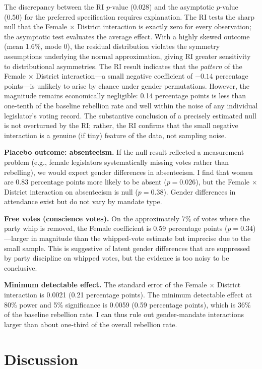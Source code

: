 \documentclass[12pt]{article}
\begin{document}
The discrepancy between the RI $p$-value (0.028) and the asymptotic $p$-value (0.50) for the preferred specification requires explanation. The RI tests the sharp null that the Female $\times$ District interaction is exactly zero for every observation; the asymptotic test evaluates the average effect. With a highly skewed outcome (mean 1.6\%, mode 0), the residual distribution violates the symmetry assumptions underlying the normal approximation, giving RI greater sensitivity to distributional asymmetries. The RI result indicates that the \textit{pattern} of the Female $\times$ District interaction---a small negative coefficient of $-0.14$ percentage points---is unlikely to arise by chance under gender permutations. However, the magnitude remains economically negligible: 0.14 percentage points is less than one-tenth of the baseline rebellion rate and well within the noise of any individual legislator's voting record. The substantive conclusion of a precisely estimated null is not overturned by the RI; rather, the RI confirms that the small negative interaction is a genuine (if tiny) feature of the data, not sampling noise.

\textbf{Placebo outcome: absenteeism.} If the null result reflected a measurement problem (e.g., female legislators systematically missing votes rather than rebelling), we would expect gender differences in absenteeism. I find that women are 0.83 percentage points more likely to be absent ($p = 0.026$), but the Female $\times$ District interaction on absenteeism is null ($p = 0.38$). Gender differences in attendance exist but do not vary by mandate type.

\textbf{Free votes (conscience votes).} On the approximately 7\% of votes where the party whip is removed, the Female coefficient is 0.59 percentage points ($p = 0.34$)---larger in magnitude than the whipped-vote estimate but imprecise due to the small sample. This is suggestive of latent gender differences that are suppressed by party discipline on whipped votes, but the evidence is too noisy to be conclusive.

\textbf{Minimum detectable effect.} The standard error of the Female $\times$ District interaction is 0.0021 (0.21 percentage points). The minimum detectable effect at 80\% power and 5\% significance is 0.0059 (0.59 percentage points), which is 36\% of the baseline rebellion rate. I can thus rule out gender-mandate interactions larger than about one-third of the overall rebellion rate.


\section{Discussion}\label{sec:discussion}
\end{document}

